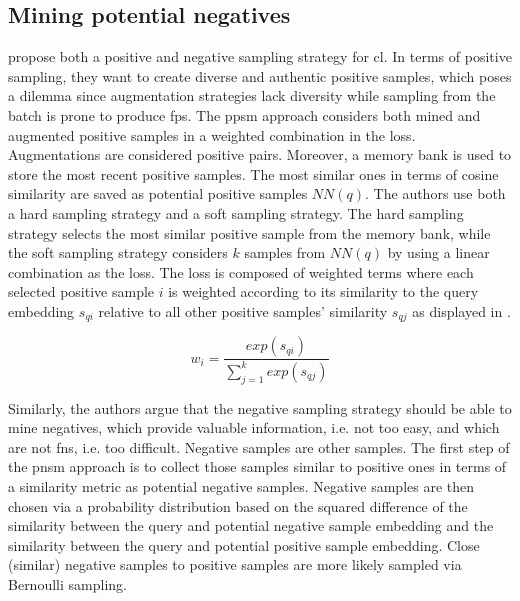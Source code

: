 \subsection{Mining potential negatives}\label{subsec:mining_potential_negatives}

\citet{mining_potential_2024} propose both a positive and negative sampling strategy for \ac{cl}.
In terms of positive sampling, they want to create diverse and authentic positive samples, 
which poses a dilemma since augmentation strategies lack diversity while sampling from the batch is prone to produce \acp{fp}.
The \ac{ppsm} approach considers both mined and augmented positive samples in a weighted combination in the loss.
Augmentations are considered positive pairs.
Moreover, a memory bank is used to store the most recent positive samples.
The most similar ones in terms of cosine similarity are saved as potential positive samples $NN(q)$.%
The authors use both a hard sampling strategy and a soft sampling strategy.
The hard sampling strategy selects the most similar positive sample from the memory bank, 
while the soft sampling strategy considers $k$ samples from $NN(q)$ by using a linear combination as the loss.
The loss is composed of weighted terms where each selected positive sample $i$ is weighted 
according to its similarity to the query embedding $s_{qi}$ relative to all other positive samples' similarity $s_{qj}$ as displayed in .

\begin{equation}
    w_i = \frac{exp(s_{qi})}{\sum_{j=1}^{k}exp(s_{qj})}
    \label{eq:ppsm}
\end{equation}

Similarly, the authors argue that the negative sampling strategy should be able to mine negatives, 
which provide valuable information, i.e. not too easy, and which are not \acp{fn}, i.e. too difficult.
Negative samples are other samples.
The first step of the \ac{pnsm} approach is to collect 
those samples similar to positive ones in terms of a similarity metric as potential negative samples.
Negative samples are then chosen via a probability distribution based on the squared difference of 
the similarity between the query and potential negative sample embedding 
and the similarity between the query and potential positive sample embedding.
Close (similar) negative samples to positive samples are more likely sampled via Bernoulli sampling.